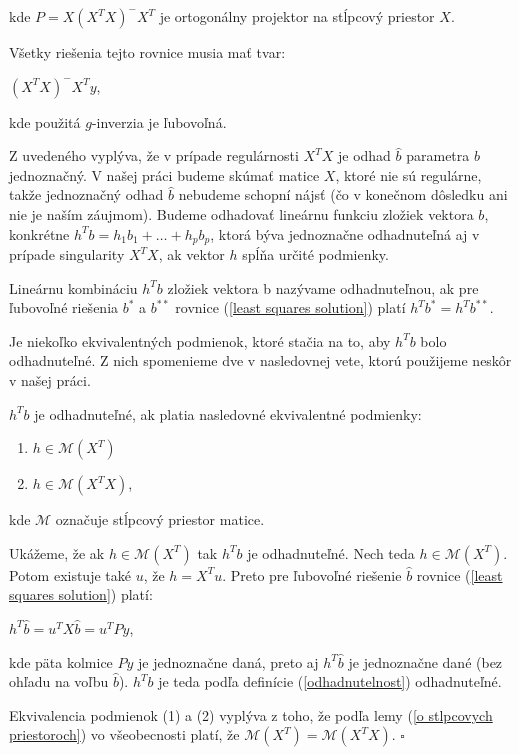 kde $P = X (X^T X)^- X^T$ je ortogonálny projektor na stĺpcový priestor $X$.

Všetky riešenia tejto rovnice musia mať tvar:

\begin{center}
$
(X^T X)^- X^T y
$,
\end{center}

kde použitá $g$-inverzia je ľubovoľná.

Z uvedeného vyplýva, že v prípade regulárnosti $X^T X$ je odhad $\hat{b}$ parametra $b$ jednoznačný. 
V našej práci budeme skúmať matice $X$, ktoré nie sú regulárne, 
takže jednoznačný odhad $\hat{b}$ nebudeme schopní nájsť (čo v konečnom dôsledku ani nie je naším záujmom).
Budeme odhadovať lineárnu funkciu zložiek vektora $b$, konkrétne $h^T b = h_1 b_1 + \ldots + h_p b_p$,
ktorá býva jednoznačne odhadnuteľná aj v prípade singularity $X^T X$, ak vektor $h$ spĺňa určité podmienky. 

\begin{defin}
\label{odhadnutelnost}
Lineárnu kombináciu $h^T b$ zložiek vektora b nazývame odhadnuteľnou,
ak pre ľubovoľné riešenia $b^*$ a $b^{**}$ rovnice (\ref{least squares solution}) platí $h^T b^* = h^T b^{**}$.
\end{defin}

Je niekoľko ekvivalentných podmienok, ktoré stačia na to, aby $h^T b$ bolo odhadnuteľné. 
Z nich spomenieme dve v nasledovnej vete, ktorú použijeme neskôr v našej práci.

\begin{theorem}
\label{veta1}
$h^T b$ je odhadnuteľné, ak platia nasledovné ekvivalentné podmienky:
\begin{enumerate}
  \item $h \in \mathcal{M}(X^T)$
  \item $h \in \mathcal{M}(X^T X)$,
\end{enumerate}
kde $\mathcal{M}$ označuje stĺpcový priestor matice.
\end{theorem}

\begin{dokaz}
Ukážeme, že ak $h \in \mathcal{M}(X^T)$ tak $h^T b$ je odhadnuteľné.
Nech teda $h \in \mathcal{M}(X^T)$. Potom existuje také $u$, že $h = X^T u$.
Preto pre ľubovoľné riešenie $\hat{b}$ rovnice (\ref{least squares solution}) platí:

\begin{center}
$
h^T \hat{b} = u^T X \hat{b} = u^T P y
$,
\end{center}

kde päta kolmice $Py$ je jednoznačne daná, preto aj $h^T \hat{b}$ je jednoznačne dané (bez ohľadu na voľbu $\hat{b}$).
$h^T b$ je teda podľa definície (\ref{odhadnutelnost}) odhadnuteľné.

Ekvivalencia podmienok (1) a (2) vyplýva z toho, že podľa lemy (\ref{o stlpcovych priestoroch}) vo všeobecnosti platí, že $\mathcal{M}(X^T) = \mathcal{M}(X^T X)$. $\square$
\end{dokaz}

